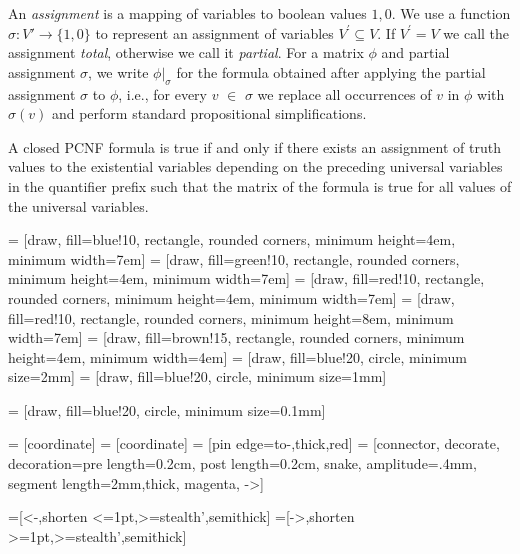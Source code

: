 \documentclass[runningheads]{llncs}
\newcommand{\matrixf}{\phi}
\newcommand{\qp}{\mathcal{Q}}
\newcommand{\0}{0}
\newcommand{\1}{1}
\begin{document}
An \textit{assignment} is a mapping of variables to boolean values $\1, \0$. We use a function $\sigma \colon V' \to \{\1, \0 \}$ to represent an assignment of variables $V^{\prime} \subseteq V$. If $V^{\prime} = V$ we call the assignment \emph{total}, otherwise we call it \emph{partial}. For a matrix $\matrixf$ and partial assignment $\sigma$, we write $\matrixf|_{\sigma}$ for the formula obtained after applying the partial assignment $\sigma$ to $\matrixf$, i.e., for every $v$ $\in$ $\sigma$ we replace all occurrences of $v$ in $\phi$ with $\sigma(v)$ and perform standard propositional simplifications.


A closed PCNF formula is true if and only if there exists an assignment of truth values to the existential variables depending on the preceding universal variables in the quantifier prefix such that the matrix of the formula is true for all values of the universal variables.
%


 = [draw, fill=blue!10, rectangle, rounded corners,
minimum height=4em, minimum width=7em]
 = [draw, fill=green!10, rectangle, rounded corners,
minimum height=4em, minimum width=7em]
 = [draw, fill=red!10, rectangle, rounded corners,
minimum height=4em, minimum width=7em]
 = [draw, fill=red!10, rectangle, rounded corners,
minimum height=8em, minimum width=7em]
 = [draw, fill=brown!15, rectangle, rounded corners,
minimum height=4em, minimum width=4em]
 = [draw, fill=blue!20, circle, minimum size=2mm]
 = [draw, fill=blue!20, circle, minimum size=1mm]

 = [draw, fill=blue!20, circle, minimum size=0.1mm]

 = [coordinate]
 = [coordinate]
 = [pin edge={to-,thick,red}]
 = [connector, decorate, decoration={pre length=0.2cm,
	post length=0.2cm, snake, amplitude=.4mm,
	segment length=2mm},thick, magenta, ->]

=[<-,shorten <=1pt,>=stealth’,semithick]
=[->,shorten >=1pt,>=stealth’,semithick]
\end{document}
